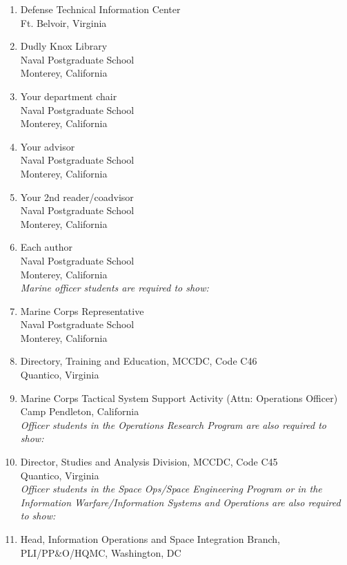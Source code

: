 \begin{enumerate}
  \item Defense Technical Information Center\\Ft. Belvoir, Virginia
  \item Dudly Knox Library\\Naval Postgraduate School\\Monterey, California
  \item Your department chair\\Naval Postgraduate School\\Monterey, California
  \item Your advisor\\Naval Postgraduate School\\Monterey, California
  \item Your 2nd reader/coadvisor\\Naval Postgraduate School\\Monterey, California
  \item Each author\\Naval Postgraduate School\\Monterey, California\\
    
  \textit{Marine officer students are required to show:}

  \item Marine Corps Representative\\Naval Postgraduate School\\Monterey, California
  \item Directory, Training and Education, MCCDC, Code C46\\Quantico, Virginia
  \item Marine Corps Tactical System Support Activity (Attn: Operations
    Officer)\\Camp Pendleton, California\\

  \textit{Officer students in the Operations Research Program are also required
    to show:}

  \item Director, Studies and Analysis Division, MCCDC, Code C45\\
    Quantico, Virginia\\

  \textit{Officer students in the Space Ops/Space Engineering Program or in the
    Information Warfare/Information Systems and Operations are also
    required to show:}

  \item Head, Information Operations and Space Integration Branch,\\
    PLI/PP\&O/HQMC, Washington, DC
\end{enumerate}


